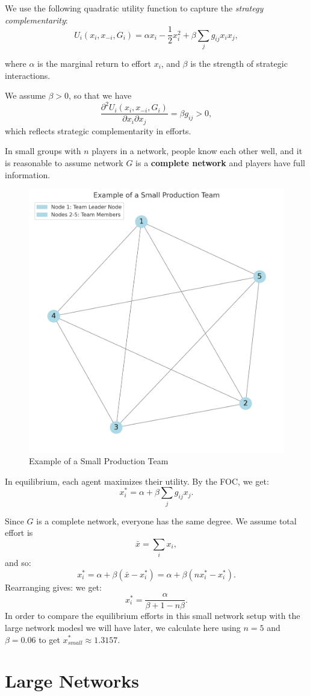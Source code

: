 \documentclass[12pt]{article}
\begin{document}
We use the following quadratic utility function to capture the \emph{strategy complementarity}:
\[
U_i(x_i, x_{-i}, G_i) = \alpha x_i - \frac{1}{2} x_i^2 + \beta \sum_j g_{ij}x_i  x_j,
\]

where $\alpha$ is the marginal return to effort $x_i$, and $\beta$ is the strength of strategic interactions.

We assume $\beta > 0$, so that we have
\[
\frac{\partial^2 U_i(x_i, x_{-i}, G_i)}{\partial x_i \partial x_j} = \beta g_{ij} > 0,
\]
which reflects strategic complementarity in efforts.

In small groups with $n$ players in a network, people know each other well, and it is reasonable to assume network $G$ is a \textbf{complete network} and players have full information.

\begin{figure}[H]
  \centering
  \includegraphics[height=0.6\textwidth]{small network1.png}
  \caption{Example of a Small Production Team}
  \label{fig:small-team}
\end{figure}

In equilibrium, each agent maximizes their utility. By the FOC, we get:
\[
x_i^* = \alpha + \beta \sum_j g_{ij} x_j. \tag{2}
\]

Since $G$ is a complete network, everyone has the same degree. We assume total effort is  
\[
\bar{x} = \sum_i x_i,
\]
and so:
\[
x_i^* = \alpha + \beta (\bar{x}-x_i^*) = \alpha + \beta(n x_i^*-x_i^*).
\]
Rearranging gives:
 we get:
\[
x_i^* = \frac{\alpha}{\beta+1-n \beta}.
\]
In order to compare the equilibrium efforts in this small network setup with the large network modesl we will have later, we calculate here using $n=5$ and $\beta=0.06$ to get $x^*_{small} \approx 1.3157$.
\section{Large Networks}
\end{document}
